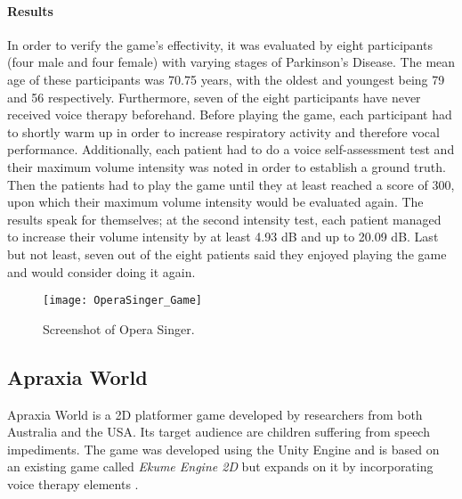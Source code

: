 \documentclass[draft,final]{vutinfth} %
\begin{document}
\paragraph{Results}
In order to verify the game's effectivity, it was evaluated by eight participants (four male and four female) with varying stages of Parkinson's Disease. The mean age of these participants was 70.75 years, with the oldest and youngest being 79 and 56 respectively. Furthermore, seven of the eight participants have never received voice therapy beforehand.
Before playing the game, each participant had to shortly warm up in order to increase respiratory activity and therefore  vocal performance. Additionally, each patient had to do a voice self-assessment test and their maximum volume intensity was noted in order to establish a ground truth. Then the patients had to play the game until they at least reached a score of 300, upon which their maximum volume intensity would be evaluated again.
The results speak for themselves; at the second intensity test, each patient managed to increase their volume intensity by at least 4.93 dB and up to 20.09 dB. Last but not least, seven out of the eight patients said they enjoyed playing the game and would consider doing it again.
\begin{figure}
\begin{center}
\texttt{[image: OperaSinger\_Game]}
\end{center}
\caption{Screenshot of Opera Singer\cite{ParkinsonGame}.}
\end{figure}
\subsection{Apraxia World}
Apraxia World is a 2D platformer game developed by researchers from both Australia and the USA. Its target audience are children suffering from speech impediments. The game was developed using the Unity Engine and is based on an existing game called \emph{Ekume Engine 2D} but expands on it by incorporating voice therapy elements \cite{hair2021longitudinal}.
\end{document}
